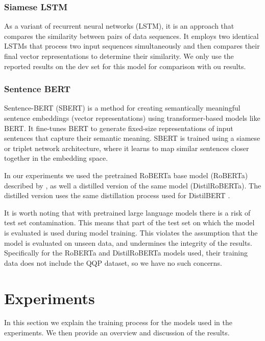 \documentclass[10pt, a4paper]{article}
\begin{document}
\subsubsection{Siamese LSTM} \label{siamese-lstm}

As a variant of recurrent neural networks (LSTM), it is an approach that compares the similarity between pairs of data sequences. It employs two identical LSTMs that process two input sequences simultaneously and then compares their final vector representations to determine their similarity.
We only use the reported results on the dev set for this model for comparison with ou results.

\subsubsection{Sentence BERT}

Sentence-BERT (SBERT) is a method for creating semantically meaningful sentence embeddings (vector representations) using transformer-based models like BERT. It fine-tunes BERT to generate fixed-size representations of input sentences that capture their semantic meaning. SBERT is trained using a siamese or triplet network architecture, where it learns to map similar sentences closer together in the embedding space.

In our experiments we used the pretrained RoBERTa base model (RoBERTa) described by \citet{liu2019roberta}, as well a distilled version of the same model (DistilRoBERTa). The distilled version uses the same distillation process used for DistilBERT \cite{sanh2019distilbert}.

It is worth noting that with pretrained large language models there is a risk of test set contamination.
This means that part of the test set on which the model is evaluated is used during model training. This violates the assumption that the model is evaluated on unseen data, and undermines the integrity of the results.
Specifically for the RoBERTa and DistilRoBERTa models used, their training data does not include the QQP dataset, so we have no such concerns.

\section{Experiments}

In this section we explain the training process for the models used in the experiments.
We then provide an overview and discussion of the results.
\end{document}
